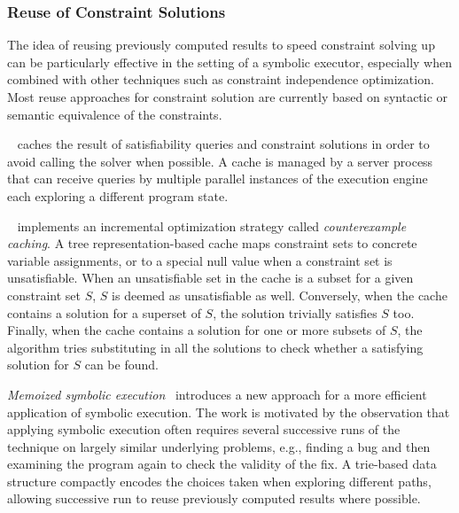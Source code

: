 
\subsubsection{Reuse of Constraint Solutions}

The idea of reusing previously computed results to speed constraint solving up can be particularly effective in the setting of a symbolic executor, especially when combined with other techniques such as constraint independence optimization. Most reuse approaches for constraint solution are currently based on syntactic or semantic equivalence of the constraints.

~\cite{EXE-CCS06} caches the result of satisfiability queries and constraint solutions in order to avoid calling the solver when possible. A cache is managed by a server process that can receive queries by multiple parallel instances of the execution engine each exploring a different program state.

~\cite{KLEE-OSDI08} implements an incremental optimization strategy called {\em counterexample caching}. A tree representation-based cache maps constraint sets to concrete variable assignments, or to a special null value when a constraint set is unsatisfiable. When an unsatisfiable set in the cache is a subset for a given constraint set $S$, $S$ is deemed as unsatisfiable as well. Conversely, when the cache contains a solution for a superset of $S$, the solution trivially satisfies $S$ too. Finally, when the cache contains a solution for one or more subsets of $S$, the algorithm tries substituting in all the solutions to check whether a satisfying solution for $S$ can be found.

{\em Memoized symbolic execution}~\cite{MEMO-ISSTA12} introduces a new approach for a more efficient application of symbolic execution. The work is motivated by the observation that applying symbolic execution often requires several successive runs of the technique on largely similar underlying problems, e.g., finding a bug and then examining the program again to check the validity of the fix. A trie-based data structure compactly encodes the choices taken when exploring different paths, allowing successive run to reuse previously computed results where possible.

